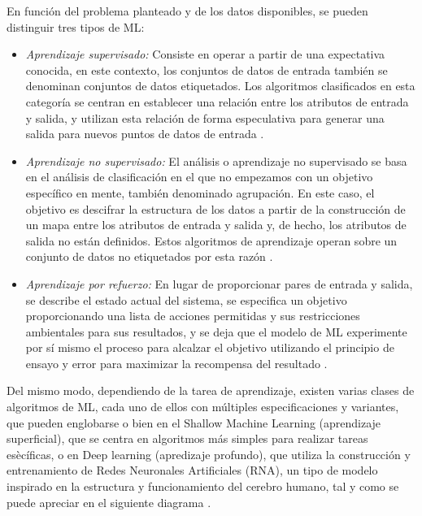 En función del problema planteado y de los datos disponibles, se pueden distinguir tres tipos de ML:

\begin{itemize}
 \item \textit{Aprendizaje supervisado:} Consiste en operar a partir de una expectativa conocida, en este contexto, los conjuntos de datos de entrada también se denominan conjuntos de datos etiquetados. Los algoritmos clasificados en esta categoría se centran en establecer una relación entre los atributos de entrada y salida, y utilizan esta relación de forma especulativa para generar una salida para nuevos puntos de datos de entrada \cite{Gollapudi16}. 
 
 \item \textit{Aprendizaje no supervisado:} El análisis o aprendizaje no supervisado se basa en el análisis de clasificación en el que no empezamos con un objetivo específico en mente, también denominado agrupación. En este caso, el objetivo es descifrar la estructura de los datos a partir de la construcción de un mapa entre los atributos de entrada y salida y, de hecho, los atributos de salida no están definidos. Estos algoritmos de aprendizaje operan sobre un conjunto de datos no etiquetados por esta razón \cite{Gollapudi16}.
 
 \item \textit{Aprendizaje por refuerzo:} En lugar de proporcionar pares de entrada y salida, se describe el estado actual del sistema, se especifica un objetivo proporcionando una lista de acciones permitidas y sus restricciones ambientales para sus resultados, y se deja que el modelo de ML experimente por sí mismo el proceso para alcalzar el objetivo utilizando el principio de ensayo y error para maximizar la recompensa del resultado \cite{Janiesch21}.
 
\end{itemize}

Del mismo modo, dependiendo de la tarea de aprendizaje, existen varias clases de algoritmos de ML, cada uno de ellos con múltiples especificaciones y variantes, que pueden englobarse o bien en el Shallow Machine Learning (aprendizaje superficial), que se centra en algoritmos más simples para realizar tareas esècíficas, o en Deep learning (apredizaje profundo), que utiliza la construcción y entrenamiento de Redes Neuronales Artificiales (RNA), un tipo de modelo inspirado en la estructura y funcionamiento del cerebro humano, tal y como se puede apreciar en el siguiente diagrama \cite{Janiesch21}. \\

